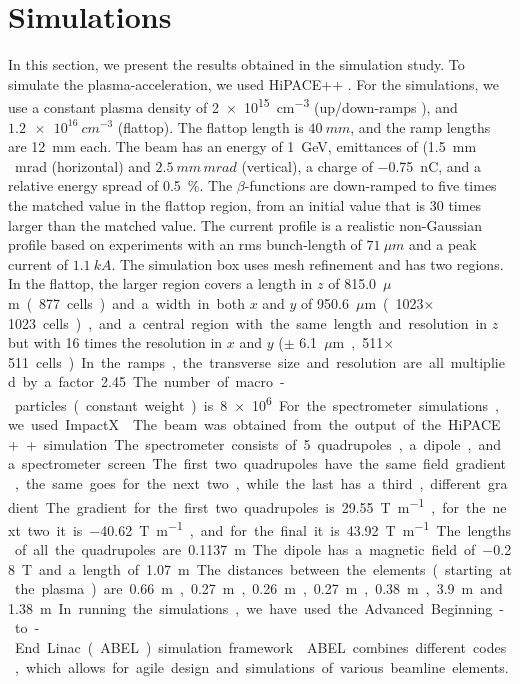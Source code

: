 \documentclass[a4paper,
               biblatex,     %
               ]{jacow}
\begin{document}
\section{Simulations}
In this section, we present the results obtained in the simulation study. To simulate the plasma-acceleration, we used HiPACE++ \cite{Hipace}. 
For the simulations, we use a constant plasma density of \SI{2e15}{cm^{-3}} (up/down-ramps \cite{uniform-ramp}), and \(\SI{1.2e16}{cm^{-3}}\) (flattop). The flattop length is \(\SI{40}{mm}\), and the ramp lengths are \SI{12}{mm} each. The beam has an energy of \SI{1}{GeV}, emittances of (\SI{1.5}{mm\,mrad} (horizontal) and \(\SI{2.5}{mm\,mrad}\) (vertical), a charge of \SI{-0.75}{nC}, and a relative energy spread of \SI{0.5}{\%}.
The $\beta$-functions are down-ramped to five times the matched value in the flattop region, from an initial value that is 30 times larger than the matched value. The current profile is a realistic non-Gaussian profile based on experiments \cite{Darcy, Lindstrom} with an rms bunch-length of \(\SI{71}{\mu m}\) and a peak current of \(\SI{1.1}{kA}\).
The simulation box uses mesh refinement and has two regions. In the flattop, the larger region covers a length in $z$ of \SI{815.0}{$\mu$m} (\SI{877} cells) and a width in both $x$ and $y$ of \SI{950.6}{$\mu$m} (\SI{1023}{}$\times$\SI{1023} cells), 
and a central region with the same length and resolution in $z$ but with \SI{16}{} times the resolution in $x$ and $y$ ($\pm$ \SI{6.1}{$\mu$m}, \SI{511}{}$\times$\SI{511} cells).
In the ramps, the transverse size and resolution are all multiplied by a factor \SI{2.45}{}.
The number of macro-particles (constant weight) is \SI{8e6}{}.

For the spectrometer simulations, we used ImpactX \cite{huebl}. The beam was obtained from the output of the HiPACE++ simulation. The spectrometer consists of 5 quadrupoles, a dipole, and a spectrometer screen. The first two quadrupoles have the same field gradient, the same goes for the next two, while the last has a third, different gradient. The gradient for the first two quadrupoles is \SI{29.55}{T\per m}, for the next two it is \SI{-40.62}{T\per m}, and for the final it is \SI{43.92}{T\per m}. The lengths of all the quadrupoles are \SI{0.1137}{m}. The dipole has a magnetic field of \SI{-0.28}{T} and a length of \SI{1.07}{m}.
The distances between the elements (starting at the plasma) are
\SI{0.66}{m}, \SI{0.27}{m}, \SI{0.26}{m}, \SI{0.27}{m}, \SI{0.38}{m}, \SI{3.9}{m} and \SI{1.38}{m}.

In running the simulations, we have used the Advanced Beginning-to-End Linac (ABEL) simulation framework \cite{ben}. ABEL combines different codes, which allows for agile design and simulations of various beamline elements.
\end{document}
